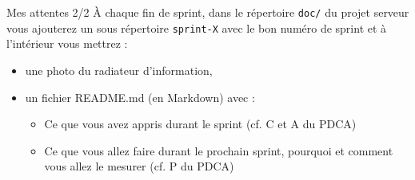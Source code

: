 \documentclass{beamer}
\begin{document}
\begin{frame}{Mes attentes 2/2}
  À chaque fin de sprint, dans le répertoire {\color{gray}\texttt{doc/}} du projet serveur vous ajouterez un sous répertoire {\color{gray}\texttt{sprint-X}} avec le bon numéro de sprint et à l'intérieur vous mettrez : 
  \begin{itemize}
    \item une photo du radiateur d'information, 
    \item un fichier README.md (en Markdown) avec :
    \begin{itemize}
      \item Ce que vous avez appris durant le sprint (cf. C et A du PDCA)
      \item Ce que vous allez faire durant le prochain sprint, pourquoi et comment vous allez le mesurer (cf. P du PDCA)
    \end{itemize}
  \end{itemize}
\end{frame}
\end{document}
